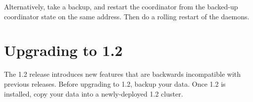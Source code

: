 Alternatively, take a backup, and restart the coordinator from the backed-up
coordinator state on the same address.  Then do a rolling restart of the
daemons.

\section{Upgrading to 1.2}
\label{sec:installation:upgrade1.2}

The 1.2 release introduces new features that are backwards incompatible with
previous releases.  Before upgrading to 1.2, backup your data.  Once 1.2 is
installed, copy your data into a newly-deployed 1.2 cluster.

